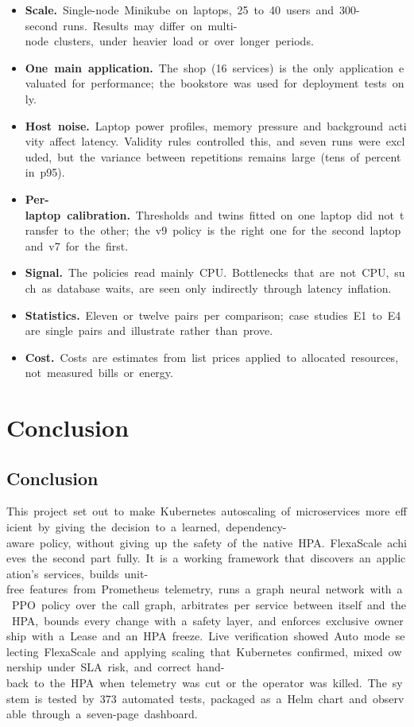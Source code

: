 \documentclass[12pt,a4paper,oneside]{report}
\begin{document}
\begin{itemize}\setlength{\itemsep}{1pt}
  \item \textbf{Scale.}~Single-node~Minikube~on~laptops,~25~to~40~users~and~300-second~runs.~Results~may~differ~on~multi-node~clusters,~under~heavier~load~or~over~longer~periods.
  \item \textbf{One~main~application.}~The~shop~(16~services)~is~the~only~application~evaluated~for~performance;~the~bookstore~was~used~for~deployment~tests~only.
  \item \textbf{Host~noise.}~Laptop~power~profiles,~memory~pressure~and~background~activity~affect~latency.~Validity~rules~controlled~this,~and~seven~runs~were~excluded,~but~the~variance~between~repetitions~remains~large~(tens~of~percent~in~p95).
  \item \textbf{Per-laptop~calibration.}~Thresholds~and~twins~fitted~on~one~laptop~did~not~transfer~to~the~other;~the~v9~policy~is~the~right~one~for~the~second~laptop~and~v7~for~the~first.
  \item \textbf{Signal.}~The~policies~read~mainly~CPU.~Bottlenecks~that~are~not~CPU,~such~as~database~waits,~are~seen~only~indirectly~through~latency~inflation.
  \item \textbf{Statistics.}~Eleven~or~twelve~pairs~per~comparison;~case~studies~E1~to~E4~are~single~pairs~and~illustrate~rather~than~prove.
  \item \textbf{Cost.}~Costs~are~estimates~from~list~prices~applied~to~allocated~resources,~not~measured~bills~or~energy.
\end{itemize}

\clearpage
\chapter{Conclusion}\label{chap:concl}

\section{Conclusion}

This~project~set~out~to~make~Kubernetes~autoscaling~of~microservices~more~efficient~by~giving~the~decision~to~a~learned,~dependency-aware~policy,~without~giving~up~the~safety~of~the~native~HPA.~FlexaScale~achieves~the~second~part~fully.~It~is~a~working~framework~that~discovers~an~application's~services,~builds~unit-free~features~from~Prometheus~telemetry,~runs~a~graph~neural~network~with~a~PPO~policy~over~the~call~graph,~arbitrates~per~service~between~itself~and~the~HPA,~bounds~every~change~with~a~safety~layer,~and~enforces~exclusive~ownership~with~a~Lease~and~an~HPA~freeze.~Live~verification~showed~Auto~mode~selecting~FlexaScale~and~applying~scaling~that~Kubernetes~confirmed,~mixed~ownership~under~SLA~risk,~and~correct~hand-back~to~the~HPA~when~telemetry~was~cut~or~the~operator~was~killed.~The~system~is~tested~by~373~automated~tests,~packaged~as~a~Helm~chart~and~observable~through~a~seven-page~dashboard.
\end{document}
